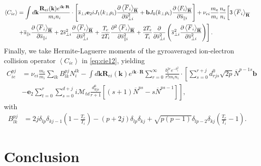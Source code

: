 \begin{align}
    \left<C_{ie}\right> &= \int d \mathbf k \frac{\mathbf R_{ei}(\mathbf k)e^{i \mathbf k \cdot \mathbf R}}{m_i n_i }\cdot\left[\overline s_{\perp i} \mathbf e_2 i J_1(k_\perp \rho_i) \frac{\partial \left< \overline F_i \right>_{\overline{\mathbf R}}}{\partial \overline s_{\perp i}^2}+\mathbf b J_0(k_\perp \rho_i) \frac{\partial \left< F_i \right>_{\overline{\mathbf R}}}{\partial \overline s_{\parallel i}}\right]+\nu_{ei}\frac{m_e}{m_i}\frac{n_e}{n_i}\bigg[3 \left< \overline F_i \right>_{\overline{\mathbf R}}\nonumber\\
    &\left. + \overline s_{\parallel i} \frac{\partial \left< \overline F_i \right>_{\overline{\mathbf R}}}{\partial \overline s_{\parallel i}} +2\overline s_{\perp i}^2 \frac{\partial \left< \overline F_i \right>_{\overline{\mathbf R}}}{\partial \overline s_{\perp i}^2}+ \frac{T_e}{2T_i}\frac{\partial^2 \left< \overline F_i \right>_{\overline{\mathbf R}}}{\partial \overline s_{\parallel i }^2}+\frac{2 T_e}{T_i} \frac{\partial}{\partial \overline s_{\perp i}^2}\left(\overline s_{\perp i}^2 \frac{\partial \left< \overline F_i \right>_{\overline{\mathbf R}}}{\partial \overline s_{\perp i}^2}\right)\right].
    \label{eq:cie12}
\end{align}
%
Finally, we take Hermite-Laguerre moments of the gyroaveraged ion-electron collision operator $\left<C_{ie}\right>$ in \cref{eq:cie12}, yielding
%
\begin{align}
    C_{ie}^{pj}&=\nu_{ei}\frac{m_e}{m_i}\sum_{lk}B_{lk}^{pj}N_{i}^{lk}-\int d \mathbf k \mathbf R_{ei}(\mathbf k) e^{i \mathbf k \cdot \mathbf R}\sum_{r=0}^{\infty}\frac{b_i^{2r}e^{-b_i^2}}{r!m_i n_i}\cdot\left[\sum_{s=0}^{r+j}d_{rjs}^0 \sqrt{2p}\overline{N}^{p-1 s}\mathbf b\right.\nonumber\\
    &\left.-\mathbf e_2\sum_{t=0}^{r}\sum_{s=0}^{d+j}i \mathcal{M}_{td} \frac{d_{djs}^0}{r+1}\left[(s+1)\overline N^{ps}-s\overline N^{ps-1}\right]\right],
\label{eq:ciepj1}
\end{align}
%
with
%
\begin{equation}
\begin{split}
    B_{lk}^{pj}&=2j\delta_{lp}\delta_{kj-1}\left(1-\frac{T_e}{T_{i}}\right)-(p+2j)\delta_{lp}\delta_{kj}+\sqrt{ p (p-1)}\delta_{l p-2}\delta_{kj}\left(\frac{T_e}{T_{i}}-1\right).
\end{split}
\end{equation}

\section{Conclusion}

